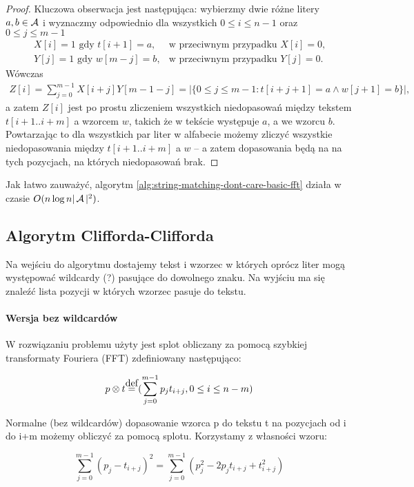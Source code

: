 \begin{proof}
Kluczowa obserwacja jest następująca: wybierzmy dwie różne litery $a, b \in \operatorname{\mathcal{A}}$ i wyznaczmy odpowiednio dla wszystkich $0 \le i \le n - 1$ oraz $0 \le j \le m - 1$
\begin{align*}
    X[i] = \text{$1$ gdy $t[i + 1] = a$}, & \text{w przeciwnym przypadku $X[i] = 0$,} \\
    Y[j] = \text{$1$ gdy $w[m - j] = b$}, & \text{w przeciwnym przypadku $Y[j] = 0$.}
\end{align*}
Wówczas
\begin{align*}
    Z[i] = \sum_{j = 0}^{m - 1} X[i + j] Y[m - 1 - j] = |\{0 \le j \le m - 1: t[i + j + 1] = a \land w[j + 1] = b \}|,
\end{align*}
a zatem $Z[i]$ jest po prostu zliczeniem wszystkich niedopasowań między tekstem $t[i + 1..i + m]$ a wzorcem $w$,
takich że w tekście występuje $a$, a we wzorcu $b$.
Powtarzając to dla wszystkich par liter w alfabecie możemy zliczyć wszystkie niedopasowania między $t[i + 1..i + m]$ a $w$ -- a zatem dopasowania będą na na tych pozycjach, na których niedopasowań brak.
\end{proof}

Jak łatwo zauważyć, algorytm \ref{alg:string-matching-dont-care-basic-fft} działa w czasie $O(n \log{n} |\operatorname{\mathcal{A}}|^2)$.

\subsection{Algorytm Clifforda-Clifforda}

Na wejściu do algorytmu dostajemy tekst i wzorzec w których oprócz liter mogą występować wildcardy (?) pasujące do dowolnego znaku. Na wyjściu ma się znaleźć lista pozycji w których wzorzec pasuje do tekstu.

\paragraph{Wersja bez wildcardów}

W rozwiązaniu problemu użyty jest splot obliczany za pomocą szybkiej transformaty Fouriera (FFT) zdefiniowany następująco:

$$
    p \otimes t \defeq (\sum^{m-1}_{j=0}p_{j}t_{i+j}, 0 \leq i \leq n-m)
$$

Normalne (bez wildcardów) dopasowanie wzorca p do tekstu t na pozycjach od i do i+m możemy obliczyć za pomocą splotu. Korzystamy z własności wzoru:

$$
    \sum_{j=0}^{m-1} (p_j - t_{i+j})^2 = \sum_{j=0}^{m-1} (p^2_{j} - 2 p_{j}t_{i+j}+t^2_{i+j})
$$

